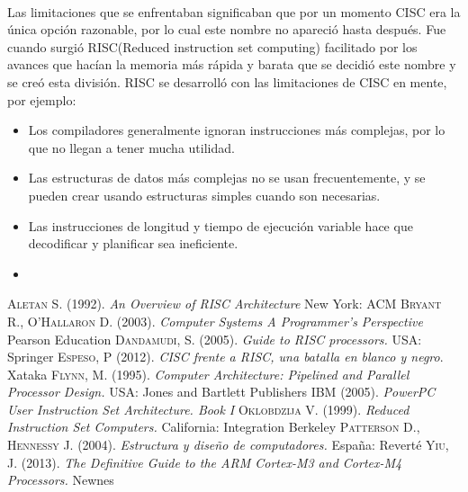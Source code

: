 \documentclass[10pt,a4paper]{article}
\begin{document}
\paragraph{}
Las limitaciones que se enfrentaban significaban que por un momento CISC era la única opción razonable, por lo cual este nombre no apareció hasta después. Fue cuando surgió RISC(Reduced instruction set computing) facilitado por los avances que hacían la memoria más rápida y barata que se decidió este nombre y se creó esta división. RISC se desarrolló con las limitaciones de CISC en mente, por ejemplo:	
\begin{itemize}
\item Los compiladores generalmente ignoran instrucciones más complejas, por 	lo que no llegan a tener mucha utilidad.
\item Las estructuras de datos más complejas no se usan frecuentemente, y se pueden crear usando estructuras simples cuando son necesarias.
\item Las instrucciones de longitud y tiempo de ejecución variable hace que decodificar y planificar sea ineficiente.
\item

\end{itemize}
\begin{thebibliography}{X}
\bibitem{}\textsc{Aletan S.} (1992). \textit{An Overview of RISC Architecture} New York: ACM
\bibitem{} \textsc{Bryant R., O’Hallaron D.} (2003). \textit{Computer Systems A Programmer’s Perspective} Pearson Education
\bibitem{}\textsc{Dandamudi, S.} (2005). \textit{Guide to RISC processors.} USA: Springer
 \textsc{Espeso, P} (2012). \textit{CISC frente a RISC, una batalla en blanco y negro}. Xataka
\bibitem{}\textsc{Flynn, M.} (1995). \textit{Computer Architecture: Pipelined and Parallel Processor Design.} USA: Jones and Bartlett Publishers
\bibitem{}\textsc{IBM} (2005). \textit{PowerPC User Instruction Set Architecture. Book I} 
\bibitem{}\textsc{Oklobdzija V.} (1999). \textit{Reduced Instruction Set Computers.} California: Integration Berkeley
\bibitem{}\textsc{Patterson D., Hennessy J.} (2004). \textit{Estructura y diseño de computadores.} España: Reverté
\bibitem{}\textsc{Yiu, J.} (2013). \textit{The Definitive Guide to the ARM Cortex-M3 and Cortex-M4 Processors.} Newnes
\end{thebibliography}
\end{document}
